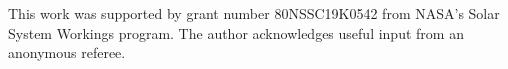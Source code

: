 \documentclass{aastex63}
\begin{document}
\acknowledgments
This work was supported by grant number 80NSSC19K0542 from NASA's Solar System Workings program. The author acknowledges useful input from an anonymous referee.





\end{document}
